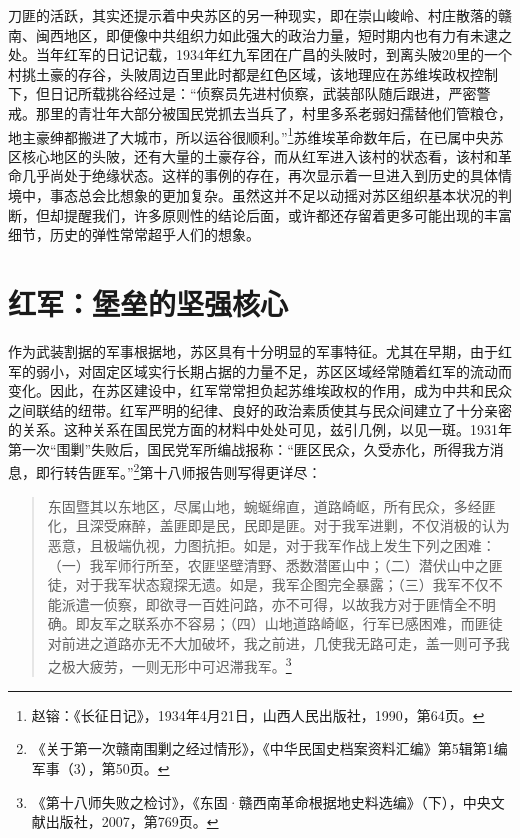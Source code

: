 刀匪的活跃，其实还提示着中央苏区的另一种现实，即在崇山峻岭、村庄散落的赣南、闽西地区，即便像中共组织力如此强大的政治力量，短时期内也有力有未逮之处。当年红军的日记记载，1934年红九军团在广昌的头陂时，到离头陂20里的一个村挑土豪的存谷，头陂周边百里此时都是红色区域，该地理应在苏维埃政权控制下，但日记所载挑谷经过是：“侦察员先进村侦察，武装部队随后跟进，严密警戒。那里的青壮年大部分被国民党抓去当兵了，村里多系老弱妇孺替他们管粮仓，地主豪绅都搬进了大城市，所以运谷很顺利。”\footnote{赵镕：《长征日记》，1934年4月21日，山西人民出版社，1990，第64页。}苏维埃革命数年后，在已属中央苏区核心地区的头陂，还有大量的土豪存谷，而从红军进入该村的状态看，该村和革命几乎尚处于绝缘状态。这样的事例的存在，再次显示着一旦进入到历史的具体情境中，事态总会比想象的更加复杂。虽然这并不足以动摇对苏区组织基本状况的判断，但却提醒我们，许多原则性的结论后面，或许都还存留着更多可能出现的丰富细节，历史的弹性常常超乎人们的想象。

\section{红军：堡垒的坚强核心}


作为武装割据的军事根据地，苏区具有十分明显的军事特征。尤其在早期，由于红军的弱小，对固定区域实行长期占据的力量不足，苏区区域经常随着红军的流动而变化。因此，在苏区建设中，红军常常担负起苏维埃政权的作用，成为中共和民众之间联结的纽带。红军严明的纪律、良好的政治素质使其与民众间建立了十分亲密的关系。这种关系在国民党方面的材料中处处可见，兹引几例，以见一斑。1931年第一次“围剿”失败后，国民党军所编战报称：“匪区民众，久受赤化，所得我方消息，即行转告匪军。”\footnote{《关于第一次赣南围剿之经过情形》，《中华民国史档案资料汇编》第5辑第1编军事（3），第50页。}第十八师报告则写得更详尽：

\begin{quote}

东固暨其以东地区，尽属山地，蜿蜒绵直，道路崎岖，所有民众，多经匪化，且深受麻醉，盖匪即是民，民即是匪。对于我军进剿，不仅消极的认为恶意，且极端仇视，力图抗拒。如是，对于我军作战上发生下列之困难：（一）我军师行所至，农匪坚壁清野、悉数潜匿山中；（二）潜伏山中之匪徒，对于我军状态窥探无遗。如是，我军企图完全暴露；（三）我军不仅不能派遣一侦察，即欲寻一百姓问路，亦不可得，以故我方对于匪情全不明确。即友军之联系亦不容易；（四）山地道路崎岖，行军已感困难，而匪徒对前进之道路亦无不大加破坏，我之前进，几使我无路可走，盖一则可予我之极大疲劳，一则无形中可迟滞我军。\footnote{《第十八师失败之检讨》，《东固·赣西南革命根据地史料选编》（下），中央文献出版社，2007，第769页。}
\end{quote}



